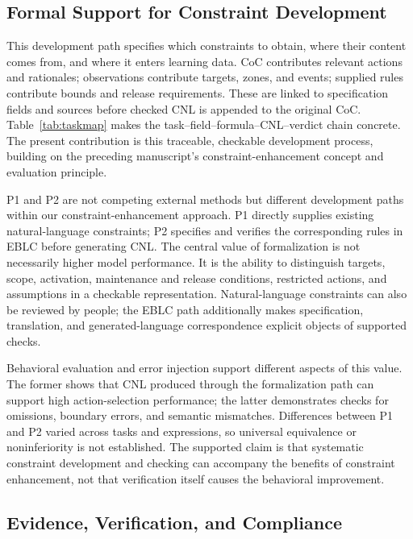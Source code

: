\documentclass[nolineno]{ieeeaccess}
\begin{document}
\subsection{Formal Support for Constraint Development}

This development path specifies which constraints to obtain, where their content comes from, and where it enters learning data. CoC contributes relevant actions and rationales; observations contribute targets, zones, and events; supplied rules contribute bounds and release requirements. These are linked to specification fields and sources before checked CNL is appended to the original CoC. Table~\ref{tab:taskmap} makes the task--field--formula--CNL--verdict chain concrete. The present contribution is this traceable, checkable development process, building on the preceding manuscript's constraint-enhancement concept and evaluation principle.\par

P1 and P2 are not competing external methods but different development paths within our constraint-enhancement approach. P1 directly supplies existing natural-language constraints; P2 specifies and verifies the corresponding rules in EBLC before generating CNL. The central value of formalization is not necessarily higher model performance. It is the ability to distinguish targets, scope, activation, maintenance and release conditions, restricted actions, and assumptions in a checkable representation. Natural-language constraints can also be reviewed by people; the EBLC path additionally makes specification, translation, and generated-language correspondence explicit objects of supported checks.\par

Behavioral evaluation and error injection support different aspects of this value. The former shows that CNL produced through the formalization path can support high action-selection performance; the latter demonstrates checks for omissions, boundary errors, and semantic mismatches. Differences between P1 and P2 varied across tasks and expressions, so universal equivalence or noninferiority is not established. The supported claim is that systematic constraint development and checking can accompany the benefits of constraint enhancement, not that verification itself causes the behavioral improvement.\par

\subsection{Evidence, Verification, and Compliance}
\end{document}
